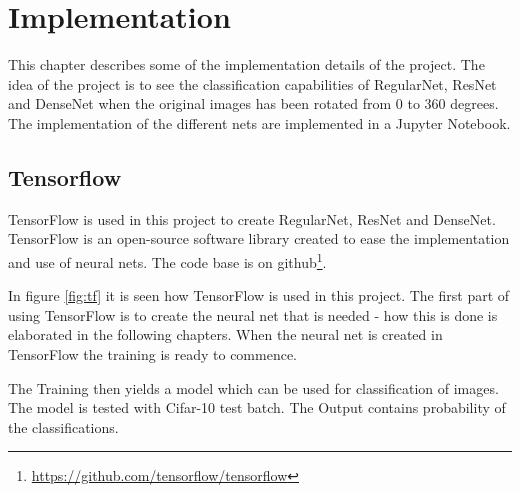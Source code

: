 \chapter{Implementation}
\label{chp:impl}

This chapter describes some of the implementation details of the project. The idea of the project is to see the classification capabilities of RegularNet, ResNet and DenseNet when the original images has been rotated from 0 to 360 degrees. The implementation of the different nets are implemented in a Jupyter Notebook.

\section{Tensorflow}
TensorFlow is used in this project to create RegularNet, ResNet and DenseNet. 
TensorFlow is an open-source software library created to ease the implementation and use of neural nets. The code base is on github\footnote{\url{https://github.com/tensorflow/tensorflow}}.

In figure \ref{fig:tf} it is seen how TensorFlow is used in this project. The first part of using TensorFlow is to create the neural net that is needed - how this is done is elaborated in the following chapters. When the neural net is created in TensorFlow the training is ready to commence. 

The Training then yields a model which can be used for classification of images. The model is tested with Cifar-10 test batch. The Output contains probability of the classifications.







